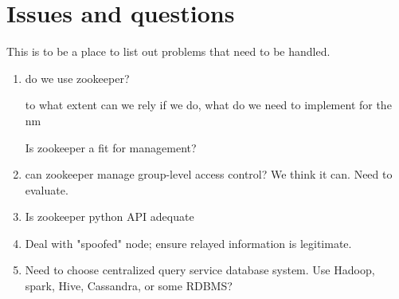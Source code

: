 \documentclass[oneside,12pt]{memoir}
\begin{document}
\section{Issues and questions}
This is to be a place to list out problems that need to be handled.
\begin{enumerate}
\item
do we use zookeeper?

to what extent can we rely if we do,  what do we need to implement for the nm


Is zookeeper a fit for management?
\item
can zookeeper manage group-level access control?  We think it can.  Need to evaluate.
\item
Is zookeeper python API adequate

\item
Deal with "spoofed" node; ensure relayed information is legitimate. 
\item
Need to choose centralized query service database system.  Use Hadoop, spark, Hive, Cassandra, or some RDBMS?

\end{enumerate}
\hypertarget{mymarker}{}
\printindex
\end{document}
